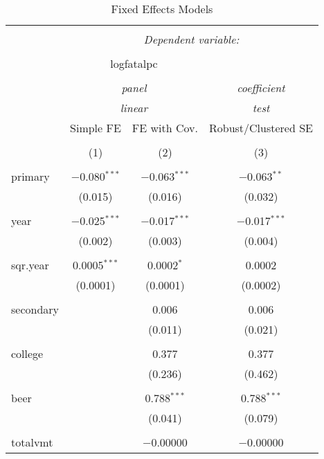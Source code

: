 \documentclass{article}
\begin{document}
\begin{table}[!htbp] \centering 
  \caption{Fixed Effects Models} 
  \label{tab:p3g} 
\footnotesize 
\begin{tabular}{@{\extracolsep{5pt}}lccc} 
\\[-1.8ex]\hline 
\hline \\[-1.8ex] 
 & \multicolumn{3}{c}{\textit{Dependent variable:}} \\ 
\cline{2-4} 
\\[-1.8ex] & \multicolumn{2}{c}{logfatalpc} &   \\ 
\\[-1.8ex] & \multicolumn{2}{c}{\textit{panel}} & \textit{coefficient} \\ 
 & \multicolumn{2}{c}{\textit{linear}} & \textit{test} \\ 
 & Simple FE & FE with Cov. & Robust/Clustered SE \\ 
\\[-1.8ex] & (1) & (2) & (3)\\ 
\hline \\[-1.8ex] 
 primary & $-$0.080$^{***}$ & $-$0.063$^{***}$ & $-$0.063$^{**}$ \\ 
  & (0.015) & (0.016) & (0.032) \\ 
  & & & \\ 
 year & $-$0.025$^{***}$ & $-$0.017$^{***}$ & $-$0.017$^{***}$ \\ 
  & (0.002) & (0.003) & (0.004) \\ 
  & & & \\ 
 sqr.year & 0.0005$^{***}$ & 0.0002$^{*}$ & 0.0002 \\ 
  & (0.0001) & (0.0001) & (0.0002) \\ 
  & & & \\ 
 secondary &  & 0.006 & 0.006 \\ 
  &  & (0.011) & (0.021) \\ 
  & & & \\ 
 college &  & 0.377 & 0.377 \\ 
  &  & (0.236) & (0.462) \\ 
  & & & \\ 
 beer &  & 0.788$^{***}$ & 0.788$^{***}$ \\ 
  &  & (0.041) & (0.079) \\ 
  & & & \\ 
 totalvmt &  & $-$0.00000 & $-$0.00000 \\ 

\end{tabular}
\end{table}
\end{document}

